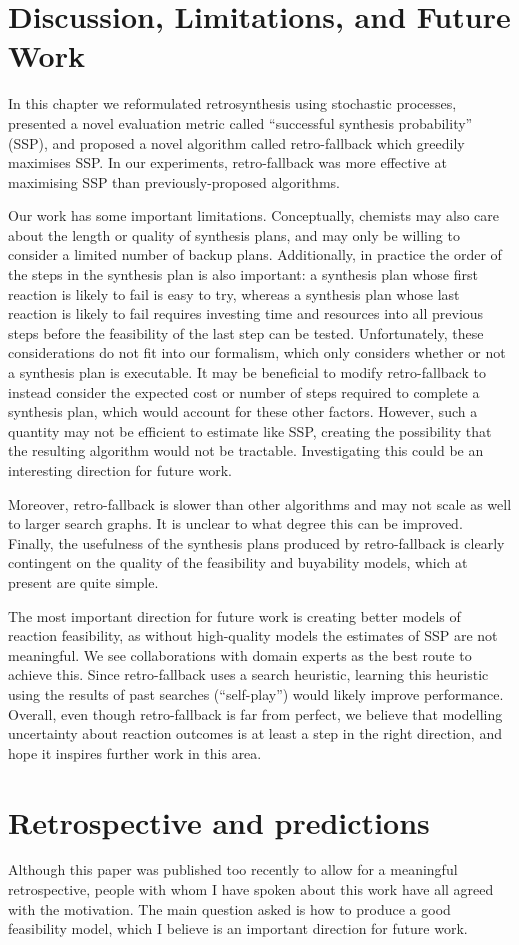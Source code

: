\section{Discussion, Limitations, and Future Work}

In this chapter we reformulated retrosynthesis using stochastic processes,
presented a novel evaluation metric called ``successful synthesis probability'' (SSP),
and proposed a novel algorithm called retro-fallback which greedily maximises SSP.
In our experiments, retro-fallback was more effective at maximising SSP
than previously-proposed algorithms.

Our work has some important limitations.
Conceptually,
chemists may also care about the length or quality of synthesis plans,
and may only be willing to consider a limited number of backup plans.
Additionally, in practice the order of the steps in the synthesis plan is also important:
a synthesis plan whose first reaction is likely to fail is easy to try,
whereas a synthesis plan whose last reaction is likely to fail requires
investing time and resources into all previous steps before the feasibility of the last step can be tested.
Unfortunately, these considerations do not fit into our formalism,
which only considers whether or not a synthesis plan is executable.
It may be beneficial to modify retro-fallback to instead consider
the expected cost or number of steps required to complete a synthesis plan,
which would account for these other factors.
However, such a quantity may not be efficient to estimate like SSP,
creating the possibility that the resulting algorithm would not be tractable.
Investigating this could be an interesting direction for future work.

Moreover,
retro-fallback is slower than other algorithms and may not scale as well to larger search graphs.
It is unclear to what degree this can be improved.
Finally, the usefulness of the synthesis plans produced by retro-fallback
is clearly contingent on the quality of the feasibility and buyability models,
which at present are quite simple.

The most important direction for future work
is creating better models of reaction feasibility,
as without high-quality models the estimates of SSP are not meaningful.
We see collaborations with domain experts as the best route to achieve this.
Since retro-fallback uses a search heuristic,
learning this heuristic using the results of past searches (``self-play'')
would likely improve performance.
Overall, even though retro-fallback is far from perfect,
we believe that modelling uncertainty about reaction outcomes is at least
a step in the right direction,
and hope it inspires further work in this area.

\section{Retrospective and predictions}

Although this paper was published too recently to allow for a meaningful retrospective,
people with whom I have spoken about this work have all agreed with the motivation.
The main question asked is how to produce a good feasibility model,
which I believe is an important direction for future work.
